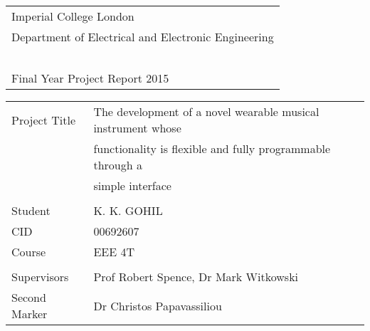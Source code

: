 \thispagestyle{empty}

\large
\begin{tabular}{|l}
Imperial College London\\
Department of Electrical and Electronic Engineering\\~\\
Final Year Project Report 2015
\end{tabular}

\vspace{150pt}
\begin{figure}[H]
   \centering
\end{figure}


\vfill

\begin{tabular}{|l l}
Project Title & The development of a novel wearable musical instrument whose \\
& functionality is flexible and fully programmable through a \\ & simple interface \\
&\\
Student & K. K. GOHIL \\ 
CID & 00692607 \\ 
Course & EEE 4T \\ &\\
Supervisors & Prof Robert Spence, Dr Mark Witkowski \\ 
Second Marker & Dr Christos Papavassiliou 
\end{tabular}
\normalsize
\newpage